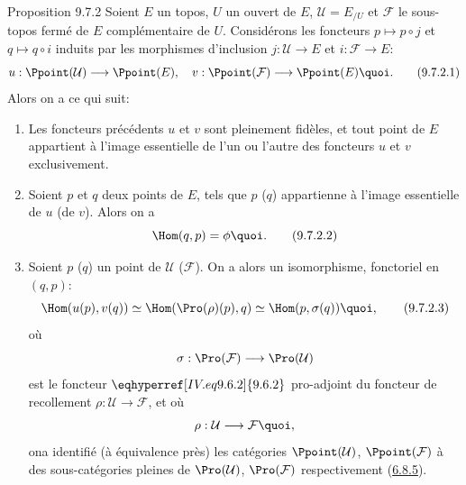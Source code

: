 \documentclass[10pt]{../fichiers-configuration-latex/smfart}
\begin{document}
\begin{enonce*}{Proposition 9.7.2}
Soient $E$ un topos, $U$ un ouvert de $E$, $\mathcal{U}=E_{/U}$ et
$\mathcal{F}$ le sous-topos fermé de $E$ complémentaire de $U$.
Considérons les foncteurs $p\mapsto p\circ j$ et $q\mapsto q\circ i$
induits par les morphismes d'inclusion $j:\mathcal{U}\rightarrow E$
et $i:\mathcal{F} \rightarrow E$:
\begin{equation*}
u:\Ppoint(\mathcal{U})\longrightarrow \Ppoint(E),\quad
v:\Ppoint(\mathcal{F})\longrightarrow
\Ppoint(E){\quoi}.\tag{9.7.2.1}
\end{equation*}
Alors on a ce qui suit:
\begin{enumerate}
\renewcommand{\theenumi}{\alph{enumi}}
\renewcommand{\labelenumi}{\theenumi)}
\item Les foncteurs précédents $u$ et $v$ sont pleinement fidèles, et
tout point de $E$ appartient à l'image essentielle de l'un ou
l'autre des foncteurs $u$ et $v$ exclusivement.

\item Soient $p$ et $q$ deux points de $E$, tels que $p$ (\resp $q$)
appartienne à l'image essentielle de $u$ (\resp de $v$). Alors on a
\begin{equation*}
\Hom(q,p)=\phi{\quoi}.\tag{9.7.2.2}
\end{equation*}

\item Soient $p$ (\resp $q$) un point de $\mathcal{U}$ (\resp $\mathcal{F}$). On a
alors un isomorphisme, fonctoriel en $(q,p)$:
\begin{equation*}
\Hom(u(p),v(q))\simeq \Hom(\Pro(\rho)(p),q)\simeq
\Hom(p,\sigma(q)){\quoi},\tag{9.7.2.3}
\end{equation*}
où
$$
\sigma:\Pro(\mathcal{F})\longrightarrow \Pro(\mathcal{U})
$$
est le foncteur $\eqhyperref[IV.eq9.6.2]{9.6.2}$ pro-adjoint du foncteur de
recollement $\rho:\mathcal{U}\rightarrow \mathcal{F}$, et où
$$
\rho:\mathcal{U}\longrightarrow \mathcal{F}{\quoi},
$$
on\pageoriginale a identifié (à équivalence près) les catégories
$\Ppoint(\mathcal{U})$, $\Ppoint(\mathcal{F})$ à des sous-catégories
pleines de $\Pro(\mathcal{U})$, $\Pro(\mathcal{F})$ respectivement
(\hyperref[IV.subsubsec6.8.5]{6.8.5}).
\end{enumerate}
\end{enonce*}
\end{document}

